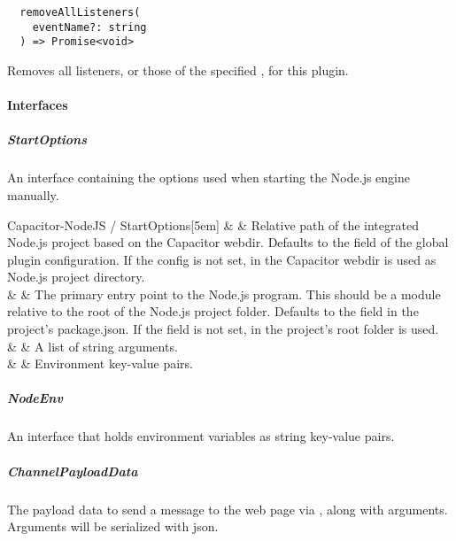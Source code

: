 \begin{verbatim}
  removeAllListeners(
    eventName?: string
  ) => Promise<void>
\end{verbatim}

Removes all listeners, or those of the specified , for this plugin.


\newpage

\paragraph{Interfaces}


\subparagraph{StartOptions}

An interface containing the options used when starting the Node.js engine manually.

\begin{interfacedesc}{Capacitor-NodeJS / StartOptions}[5em]
   &    & Relative path of the integrated Node.js project based on the Capacitor webdir. Defaults to the  field of the global plugin configuration. If the  config is not set,  in the Capacitor webdir is used as Node.js project directory. \\ \hline
    &    & The primary entry point to the Node.js program. This should be a module relative to the root of the Node.js project folder. Defaults to the  field in the project's package.json. If the  field is not set,  in the project's root folder is used. \\ \hline
      &  & A list of string arguments. \\ \hline
       &   & Environment key-value pairs. \\ \hline
\end{interfacedesc}


\subparagraph{NodeEnv}

An interface that holds environment variables as string key-value pairs.


\subparagraph{ChannelPayloadData}

The payload data to send a message to the web page via ,
along with arguments. Arguments will be serialized with \ac{json}.


